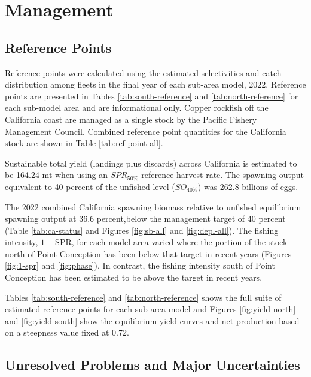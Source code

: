 \documentclass[11pt,
  letterpaper,
]{article}
\begin{document}
\section{Management}\label{management}

\subsection{Reference Points}\label{reference-points-1}

Reference points were calculated using the estimated selectivities and catch distribution among fleets in the final year of each sub-area model, 2022. Reference points are presented in Tables \ref{tab:south-reference} and \ref{tab:north-reference} for each sub-model area and are informational only. Copper rockfish off the California coast are managed as a single stock by the Pacific Fishery Management Council. Combined reference point quantities for the California stock are shown in Table \ref{tab:ref-point-all}.

Sustainable total yield (landings plus discards) across California is estimated to be 164.24 mt when using an \(SPR_{50\%}\) reference harvest rate. The spawning output equivalent to 40 percent of the unfished level (\(SO_{40\%}\)) was 262.8 billions of eggs.

The 2022 combined California spawning biomass relative to unfished equilibrium spawning output at 36.6 percent,below the management target of 40 percent (Table \ref{tab:ca-status} and Figures \ref{fig:sb-all} and \ref{fig:depl-all}). The fishing intensity, \(1-\text{SPR}\), for each model area varied where the portion of the stock north of Point Conception has been below that target in recent years (Figures \ref{fig:1-spr} and \ref{fig:phase}). In contrast, the fishing intensity south of Point Conception has been estimated to be above the target in recent years.

Tables \ref{tab:south-reference} and \ref{tab:north-reference} shows the full suite of estimated reference points for each sub-area model and Figures \ref{fig:yield-north} and \ref{fig:yield-south} show the equilibrium yield curves and net production based on a steepness value fixed at 0.72.

\subsection{Unresolved Problems and Major Uncertainties}\label{unresolved-problems-and-major-uncertainties-1}
\end{document}
